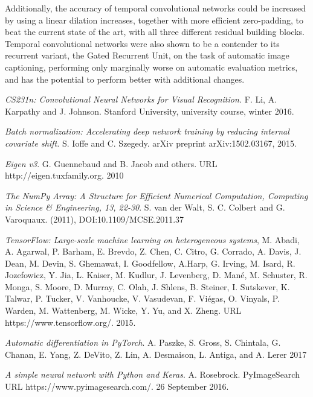 \documentclass[a4paper, twoside]{article}
\begin{document}
Additionally, the accuracy of temporal convolutional networks could be increased by using a linear dilation increases, together with more efficient zero-padding, to beat the current state of the art, with all three different residual building blocks. Temporal convolutional networks were also shown to be a contender to its recurrent variant, the Gated Recurrent Unit, on the task of automatic image captioning, performing only marginally worse on automatic evaluation metrics, and has the potential to perform better with additional changes. 

\begin{thebibliography}{99}	
	\textit{CS231n: Convolutional Neural Networks for Visual Recognition.}
    F. Li, A. Karpathy and J. Johnson.
	Stanford University, university course, winter 2016.
	
	\textit{Batch normalization: Accelerating deep network training by reducing internal covariate shift.}
    S. Ioffe and C. Szegedy. 
	arXiv preprint arXiv:1502.03167, 2015.

\textit{Eigen v3}.
G. Guennebaud and B. Jacob and others. URL http://eigen.tuxfamily.org. 2010

\textit{The NumPy Array: A Structure for Efficient Numerical Computation, Computing in Science \& Engineering, 13, 22-30}.
S. van der Walt, S. C. Colbert and G. Varoquaux.  (2011), DOI:10.1109/MCSE.2011.37 

 

\textit{TensorFlow: Large-scale machine learning on heterogeneous systems},
M. Abadi, A. Agarwal, P. Barham, E. Brevdo,
Z. Chen, C. Citro, G. Corrado, A. Davis,
J. Dean, M. Devin, S. Ghemawat, I. Goodfellow,
A.Harp, G. Irving, M. Isard, R. Jozefowicz, Y. Jia,
L. Kaiser, M. Kudlur, J. Levenberg, D. Mané, M. Schuster,
R. Monga, S. Moore, D. Murray, C. Olah, J. Shlens,
B. Steiner, I. Sutskever, K. Talwar, P. Tucker,
V. Vanhoucke, V. Vasudevan, F. Viégas,
O. Vinyals, P. Warden, M. Wattenberg, M. Wicke,
Y. Yu, and X. Zheng.
URL https://www.tensorflow.org/.
2015.

\textit{Automatic differentiation in PyTorch}.
A. Paszke,   S. Gross, S. Chintala,   G. Chanan,   E. Yang,   Z. DeVito,   Z. Lin,   A. Desmaison,   L. Antiga,  and A. Lerer
2017

	\textit{A simple neural network with Python and Keras}.
	A. Rosebrock.
	PyImageSearch
	URL https://www.pyimagesearch.com/.
	26 September 2016.
	

\end{thebibliography}
\end{document}
